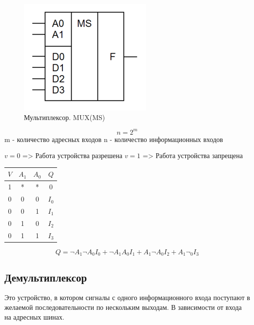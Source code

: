 \documentclass[a4paper]{article}
\begin{document}
\begin{figure}[ht]
    \centering
    \includegraphics[width=\linewidth/3]{MUX.png}
    \caption{Мультиплексор. MUX(MS)}
\end{figure}

$$ n = 2^m $$
m - количество адресных входов
n - количество информационных входов

$ v = 0 $ => Работа устройства разрешена
$ v = 1 $ => Работа устройства запрещена

\begin{table}[ht]
\centering
\begin{tabular}{|c|c|c|c|}
\hline
$V$ & $A_1$ & $A_0$ & $Q$ \\
\hline
1 & * & * & 0 \\
0 & 0 & 0 & $I_0$ \\
0 & 0 & 1 & $I_1$ \\
0 & 1 & 0 & $I_2$ \\
0 & 1 & 1 & $I_3$ \\
\hline
\end{tabular}
\end{table}

$$Q = \neg A_1\neg A_0I_0 + \neg A_1A_0I_1 + A_1\neg A_0I_2 + A_1\neg _0I_3$$

\subsection{Демультиплексор}
Это устройство, в котором сигналы с одного информационного входа поступают в желаемой последовательности по нескольким выходам. В зависимости от входа на адресных шинах.
\end{document}
